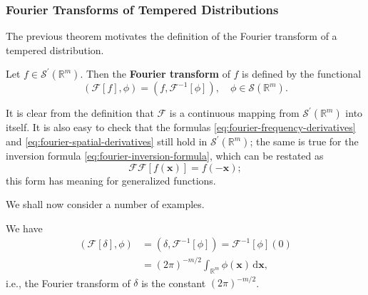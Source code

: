 \subsubsection{Fourier Transforms of Tempered Distributions}\label{subsec:tempered-fourier-transform}

The previous theorem motivates the definition of the Fourier transform of a tempered distribution.

\begin{Definition}
\label{def:tempered-fourier-transform}
Let $f\in\mathcal{S}^{\prime}(\mathbb{R}^m)$. Then the \textbf{Fourier transform} of $f$ is defined by the functional
\begin{equation}\label{eq:tempered-distribution-fourier-definition}
(\mathcal{F}[f],\phi)=(f,\mathcal{F}^{-1}[\phi]),\quad\phi\in\mathcal{S}(\mathbb{R}^m).
\end{equation}

\end{Definition}

It is clear from the definition that $\mathcal{F}$ is a continuous mapping from $\mathcal{S}^{\prime}(\mathbb{R}^m)$ into itself. It is also easy to check that the formulas \eqref{eq:fourier-frequency-derivatives} and \eqref{eq:fourier-spatial-derivatives} still hold in $\mathcal{S}^{\prime}(\mathbb{R}^m)$; the same is true for the inversion formula \eqref{eq:fourier-inversion-formula}, which can be restated as
\begin{equation}\label{eq:fourier-transform-twice-reflection}
\mathcal{F}\mathcal{F}[f(\bm{x})]=f(-\bm{x});
\end{equation}
this form has meaning for generalized functions.

We shall now consider a number of examples.

\begin{Example}
\label{ex:fourier-delta}
We have
\begin{equation}\label{eq:fourier-transform-delta-pairing}
\begin{aligned}
(\mathcal{F}[\delta],\phi)&=(\delta,\mathcal{F}^{-1}[\phi])=\mathcal{F}^{-1}[\phi](0)\\
&=(2\pi)^{-m/2}\int_{\mathbb{R}^m}\phi(\bm{x})\,\mathrm{d}\bm{x},
\end{aligned}
\end{equation}
i.e., the Fourier transform of $\delta$ is the constant $(2\pi)^{-m/2}$.
\end{Example}

